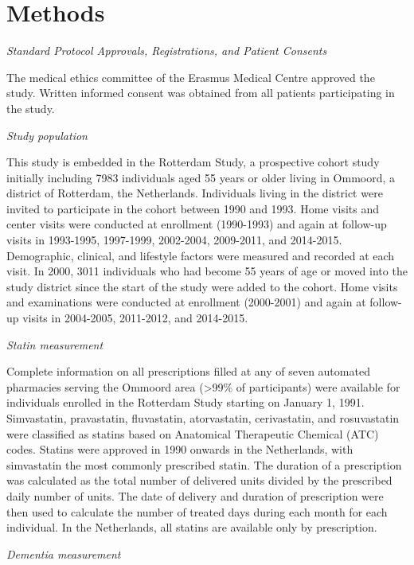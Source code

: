 \documentclass[
]{book}
\begin{document}
\hypertarget{methods}{%
\section{Methods}\label{methods}}

\emph{Standard Protocol Approvals, Registrations, and Patient Consents}

The medical ethics committee of the Erasmus Medical Centre approved the study. Written
informed consent was obtained from all patients participating in the study.

\emph{Study population}

This study is embedded in the Rotterdam Study, a prospective cohort study initially including 7983 individuals aged 55 years or older living in Ommoord, a district of Rotterdam, the Netherlands\autocite{hofman2015}. Individuals living in the district were invited to participate in the cohort between 1990 and 1993. Home visits and center visits were conducted at enrollment (1990-1993) and again at follow-up visits in 1993-1995, 1997-1999, 2002-2004, 2009-2011, and 2014-2015. Demographic, clinical, and lifestyle factors were measured and recorded at each visit. In 2000, 3011 individuals who had become 55 years of age or moved into the study district since the start of the study were added to the cohort. Home visits and examinations were conducted at enrollment (2000-2001) and again at follow-up visits in 2004-2005, 2011-2012, and 2014-2015.

\emph{Statin measurement}

Complete information on all prescriptions filled at any of seven automated pharmacies serving the Ommoord area (\textgreater99\% of participants) were available for individuals enrolled in the Rotterdam Study starting on January 1, 1991\autocite{hofman2015}. Simvastatin, pravastatin, fluvastatin, atorvastatin, cerivastatin, and rosuvastatin were classified as statins based on Anatomical Therapeutic Chemical (ATC) codes. Statins were approved in 1990 onwards in the Netherlands, with simvastatin the most commonly prescribed statin\autocite{mantel2002}. The duration of a prescription was calculated as the total number of delivered units divided by the prescribed daily number of units.
The date of delivery and duration of prescription were then used to calculate the number of treated days during each month for each individual. In the Netherlands, all statins are available only by prescription.

\emph{Dementia measurement}
\end{document}
